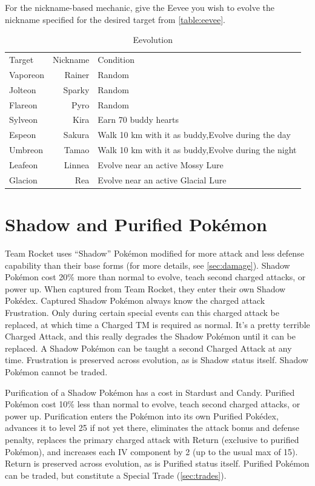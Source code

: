 For the nickname-based mechanic, give the Eevee you wish to evolve the nickname
  specified for the desired target from \autoref{table:eevee}.
\begin{table}
  \begin{center}
    \begin{tabular}{lrp{}}
      Target & Nickname & Condition\\
      \Midrule
      Vaporeon & Rainer & Random\\
      Jolteon & Sparky & Random\\
      Flareon & Pyro & Random\\
      Sylveon & Kira & Earn 70 buddy hearts \\
      Espeon & Sakura & Walk 10 km with it as buddy,\newline Evolve during the day\\
      Umbreon & Tamao & Walk 10 km with it as buddy,\newline Evolve during the night\\
      Leafeon & Linnea & Evolve near an active Mossy Lure\\
      Glacion & Rea & Evolve near an active Glacial Lure\\
    \end{tabular}
  \end{center}
  \caption{Eevolution}
  \label{table:eevee}
\end{table}

\section{Shadow and Purified Pokémon}
\label{sec:shadow}
Team Rocket uses ``Shadow'' Pokémon modified for more attack
 and less defense capability than their base forms (for more details,
 see \autoref{sec:damage}).
Shadow Pokémon cost 20\% more than normal to evolve, teach second charged attacks, or power up.
When captured from Team Rocket, they enter their own Shadow Pokédex.
Captured Shadow Pokémon always know the charged attack Frustration.
Only during certain special events can this charged attack be replaced,
 at which time a Charged TM is required as normal.
It's a pretty terrible Charged Attack, and this really degrades the
 Shadow Pokémon until it can be replaced.
A Shadow Pokémon can be taught a second Charged Attack at any time.
Frustration is preserved across evolution, as is Shadow status itself.
Shadow Pokémon cannot be traded.

Purification of a Shadow Pokémon has a cost in Stardust and Candy.
Purified Pokémon cost 10\% less than normal to evolve, teach second charged attacks, or power up.
Purification enters the Pokémon into its own Purified Pokédex,
 advances it to level 25 if not yet there,
 eliminates the attack bonus and defense penalty,
 replaces the primary charged attack with Return (exclusive to purified Pokémon),
 and increases each IV component by 2  (up to the usual max of 15).
Return is preserved across evolution, as is Purified status itself.
Purified Pokémon can be traded, but constitute a Special Trade (\autoref{sec:trades}).

